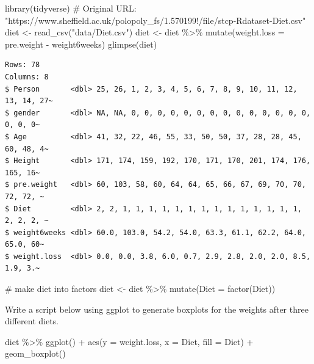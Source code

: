 \documentclass[
  letterpaper,
  DIV=11,
  numbers=noendperiod]{scrreprt}
\newenvironment{Shaded}{\begin{snugshade}}{\end{snugshade}}
\newcommand{\AttributeTok}[1]{\textcolor[rgb]{0.40,0.45,0.13}{#1}}
\newcommand{\CommentTok}[1]{\textcolor[rgb]{0.37,0.37,0.37}{#1}}
\newcommand{\FunctionTok}[1]{\textcolor[rgb]{0.28,0.35,0.67}{#1}}
\newcommand{\NormalTok}[1]{\textcolor[rgb]{0.00,0.23,0.31}{#1}}
\newcommand{\OtherTok}[1]{\textcolor[rgb]{0.00,0.23,0.31}{#1}}
\newcommand{\SpecialCharTok}[1]{\textcolor[rgb]{0.37,0.37,0.37}{#1}}
\newcommand{\StringTok}[1]{\textcolor[rgb]{0.13,0.47,0.30}{#1}}
\begin{document}
\begin{Shaded}
\begin{Highlighting}[]
\FunctionTok{library}\NormalTok{(tidyverse)}
\CommentTok{\# Original URL: "https://www.sheffield.ac.uk/polopoly\_fs/1.570199!/file/stcp{-}Rdataset{-}Diet.csv"}
\NormalTok{diet }\OtherTok{\textless{}{-}} \FunctionTok{read\_csv}\NormalTok{(}\StringTok{"data/Diet.csv"}\NormalTok{) }
\NormalTok{diet }\OtherTok{\textless{}{-}}\NormalTok{ diet }\SpecialCharTok{\%\textgreater{}\%} \FunctionTok{mutate}\NormalTok{(}\AttributeTok{weight.loss =}\NormalTok{ pre.weight }\SpecialCharTok{{-}}\NormalTok{ weight6weeks) }
\FunctionTok{glimpse}\NormalTok{(diet)}
\end{Highlighting}
\end{Shaded}

\begin{verbatim}
Rows: 78
Columns: 8
$ Person       <dbl> 25, 26, 1, 2, 3, 4, 5, 6, 7, 8, 9, 10, 11, 12, 13, 14, 27~
$ gender       <dbl> NA, NA, 0, 0, 0, 0, 0, 0, 0, 0, 0, 0, 0, 0, 0, 0, 0, 0, 0~
$ Age          <dbl> 41, 32, 22, 46, 55, 33, 50, 50, 37, 28, 28, 45, 60, 48, 4~
$ Height       <dbl> 171, 174, 159, 192, 170, 171, 170, 201, 174, 176, 165, 16~
$ pre.weight   <dbl> 60, 103, 58, 60, 64, 64, 65, 66, 67, 69, 70, 70, 72, 72, ~
$ Diet         <dbl> 2, 2, 1, 1, 1, 1, 1, 1, 1, 1, 1, 1, 1, 1, 1, 1, 2, 2, 2, ~
$ weight6weeks <dbl> 60.0, 103.0, 54.2, 54.0, 63.3, 61.1, 62.2, 64.0, 65.0, 60~
$ weight.loss  <dbl> 0.0, 0.0, 3.8, 6.0, 0.7, 2.9, 2.8, 2.0, 2.0, 8.5, 1.9, 3.~
\end{verbatim}

\begin{Shaded}
\begin{Highlighting}[]
\CommentTok{\# make diet into factors}
\NormalTok{diet }\OtherTok{\textless{}{-}}\NormalTok{ diet }\SpecialCharTok{\%\textgreater{}\%} \FunctionTok{mutate}\NormalTok{(}\AttributeTok{Diet =} \FunctionTok{factor}\NormalTok{(Diet))}
\end{Highlighting}
\end{Shaded}

Write a script below using ggplot to generate boxplots for the weights
after three different diets.

\begin{Shaded}
\begin{Highlighting}[]
\NormalTok{diet }\SpecialCharTok{\%\textgreater{}\%} \FunctionTok{ggplot}\NormalTok{() }\SpecialCharTok{+} 
  \FunctionTok{aes}\NormalTok{(}\AttributeTok{y =}\NormalTok{ weight.loss, }
      \AttributeTok{x =}\NormalTok{ Diet, }
      \AttributeTok{fill =}\NormalTok{ Diet) }\SpecialCharTok{+} 
  \FunctionTok{geom\_boxplot}\NormalTok{()}
\end{Highlighting}
\end{Shaded}
\end{document}
